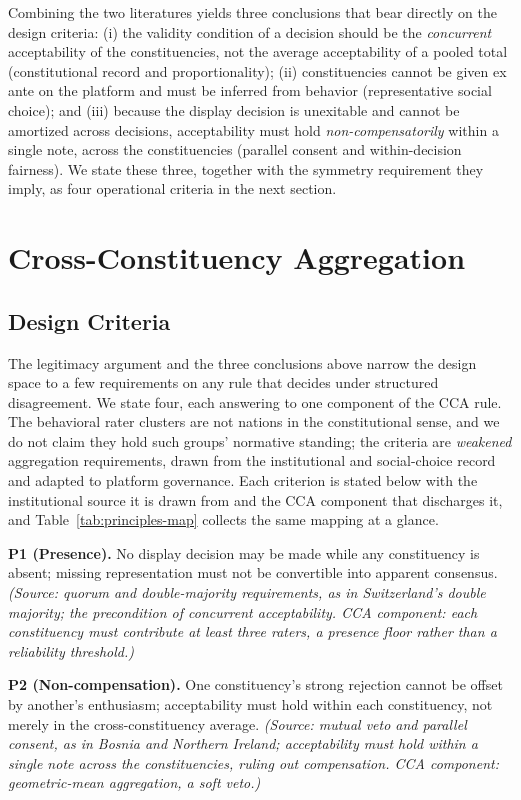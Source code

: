 \documentclass[10pt,twocolumn]{article}
\begin{document}
Combining the two literatures yields three conclusions that bear directly on the
design criteria: (i) the validity condition of a decision should be the
\emph{concurrent} acceptability of the constituencies, not the average
acceptability of a pooled total (constitutional record and proportionality);
(ii) constituencies cannot be given ex ante on the platform and must be inferred
from behavior (representative social choice); and (iii) because the display
decision is unexitable and cannot be amortized across decisions, acceptability
must hold \emph{non-compensatorily} within a single note, across the
constituencies (parallel consent and within-decision fairness). We state these
three, together with the symmetry requirement they imply, as four operational
criteria in the next section.

\section{Cross-Constituency Aggregation}
\label{sec:cca}

\subsection*{Design Criteria}

The legitimacy argument and the three conclusions above narrow the design space
to a few requirements on any rule that decides under structured disagreement. We
state four, each answering to one component of the CCA rule. The behavioral rater
clusters are not nations in the constitutional sense, and we do not claim they
hold such groups' normative standing; the criteria are \emph{weakened}
aggregation requirements, drawn from the institutional and social-choice record
and adapted to platform governance. Each criterion is stated below with the
institutional source it is drawn from and the CCA component that discharges it,
and Table~\ref{tab:principles-map} collects the same mapping at a glance.

\textbf{P1 (Presence).} No display decision may be made while any constituency is
absent; missing representation must not be convertible into apparent consensus.
\emph{(Source: quorum and double-majority requirements, as in Switzerland's
double majority; the precondition of concurrent acceptability. CCA component:
each constituency must contribute at least three raters, a presence floor rather
than a reliability threshold.)}

\textbf{P2 (Non-compensation).} One constituency's strong rejection cannot be
offset by another's enthusiasm; acceptability must hold within each constituency,
not merely in the cross-constituency average. \emph{(Source: mutual veto and
parallel consent, as in Bosnia and Northern Ireland; acceptability must hold
within a single note across the constituencies, ruling out compensation. CCA
component: geometric-mean aggregation, a soft veto.)}
\end{document}
